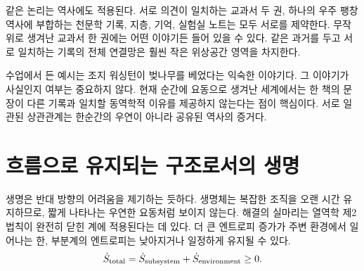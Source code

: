 같은 논리는 역사에도 적용된다. 서로 의견이 일치하는 교과서 두 권, 하나의 우주 팽창 역사에 부합하는 천문학 기록, 지층, 기억, 실험실 노트는 모두 서로를 제약한다. 무작위로 생겨난 교과서 한 권에는 어떤 이야기든 들어 있을 수 있다. 같은 과거를 두고 서로 일치하는 기록의 전체 연결망은 훨씬 작은 위상공간 영역을 차지한다.

수업에서 든 예시는 조지 워싱턴이 벚나무를 베었다는 익숙한 이야기다. 그 이야기가 사실인지 여부는 중요하지 않다. 현재 순간에 요동으로 생겨난 세계에서는 한 책의 문장이 다른 기록과 일치할 동역학적 이유를 제공하지 않는다는 점이 핵심이다. 서로 일관된 상관관계는 한순간의 우연이 아니라 공유된 역사의 증거다.

\begin{classroomqa}
\end{classroomqa}

\begin{classroomqa}
\end{classroomqa}

\section{흐름으로 유지되는 구조로서의 생명}

생명은 반대 방향의 어려움을 제기하는 듯하다. 생명체는 복잡한 조직을 오랜 시간 유지하므로, 짧게 나타나는 우연한 요동처럼 보이지 않는다. 해결의 실마리는 열역학 제2법칙이 완전히 닫힌 계에 적용된다는 데 있다. 더 큰 엔트로피 증가가 주변 환경에서 일어나는 한, 부분계의 엔트로피는 낮아지거나 일정하게 유지될 수 있다.
\begin{equation}
 \dot S_{\rm total}
 =\dot S_{\rm subsystem}+\dot S_{\rm environment}\geq 0.
 \label{eq:sm8-open-system-second-law}
\end{equation}

